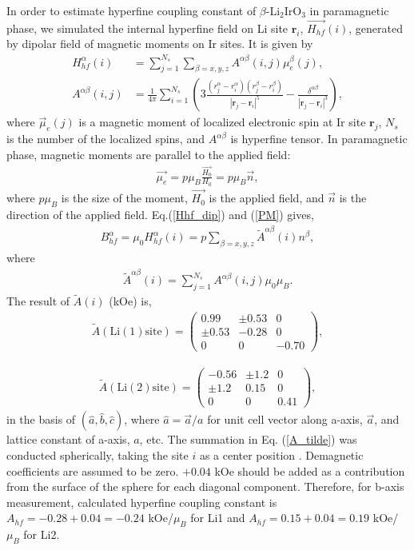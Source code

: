 \documentclass[a4,10.5pt]{report}
\begin{document}
In order to estimate hyperfine coupling constant of $\beta$-Li$_2$IrO$_3$ in paramagnetic phase,
we simulated the internal hyperfine field on Li site $\bm{r}_i$, $\overrightarrow{H_{hf}}(i)$, generated by dipolar field of magnetic moments on Ir sites.
It is given by
\begin{align}
\label{Hhf_dip}
H^\alpha_{hf}(i) &= \sum^{N_s}_{j = 1}\sum_{\beta = x,y,z}A^{\alpha\beta}(i, j)\mu^\beta_e(j),\\
A^{\alpha\beta} (i, j) &= \frac{1}{4\pi}\sum^{N_s}_{i = 1}\left(3\frac{(r^\alpha_j-r^\alpha_i)(r^\beta_j-r^\beta_i)}{|\bm{r}_j - \bm{r}_i|^5}
  - \frac{\delta^{\alpha\beta}}{|\bm{r}_j - \bm{r}_i|^3}\right),
\end{align}
where $\vec{\mu}_e(j)$ is a magnetic moment of localized electronic spin at Ir site $\bm{r}_j$, $N_s$ is the number of the localized spins, and $A^{\alpha\beta}$ is hyperfine tensor.
In paramagnetic phase, magnetic moments are parallel to the applied field:
\begin{align}
\label{PM}
\vec{\mu_e} = p\mu_B \frac{\vec{H_0}}{H_0}= p\mu_B\vec{n},
\end{align}
where $p\mu_B$ is the size of the moment, $\vec{H_0}$ is the applied field, and $\vec{n}$ is the direction of the applied field.
Eq.(\ref{Hhf_dip}) and (\ref{PM}) gives,
\begin{align}
\label{Bhf_n}
B^\alpha_{hf} = \mu_0 H^\alpha_{hf}(i) = p\sum_{\beta = x,y,z}\tilde{A}^{\alpha\beta}(i)n^\beta,
\end{align}
where
\begin{align}
\label{A_tilde}
\tilde{A}^{\alpha\beta} (i) = \sum^{N_s}_{j = 1} A^{\alpha\beta}(i, j)\mu_0\mu_B.
\end{align}
The result of $\tilde{A}(i)$ (kOe) is, 
\begin{align}
\label{Li1}
\tilde{A}(\mathrm{Li(1)site}) =
\begin{pmatrix}
0.99 & \pm0.53 & 0\\
\pm0.53 & -0.28 & 0\\
0 & 0 & -0.70
\end{pmatrix},
\end{align}

\begin{align}
\label{Li2}
\tilde{A}(\mathrm{Li(2)site}) =
\begin{pmatrix}
-0.56 & \pm1.2 & 0\\
\pm1.2 & 0.15 & 0\\
0 & 0 & 0.41
\end{pmatrix},
\end{align}
in the basis of $(\hat{a}, \hat{b}, \hat{c})$, where $\hat{a} = \vec{a}/a$ for unit cell vector along a-axis, $\vec{a}$, and lattice constant of a-axis, $a$, etc.
The summation in Eq. (\ref{A_tilde}) was conducted spherically, taking the site $i$ as a center position \cite{Kanamori}.
Demagnetic coefficients are assumed to be zero. 
$+ 0 .04$ kOe should be added as a contribution from the surface of the sphere for each diagonal component.
Therefore, for b-axis measurement, calculated hyperfine coupling constant is $A_{hf} = -0.28 + 0.04 = -0.24$ kOe/$\mu_B$ for Li1 and $A_{hf} = 0.15 + 0.04 = 0.19$ kOe/$\mu_B$ for Li2.
 
\end{document}

